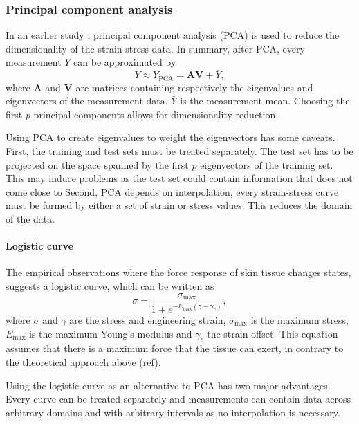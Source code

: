 \subsubsection{Principal component analysis}
In an earlier study \cite{Soylu2022}, principal component analysis (PCA) is used to reduce the dimensionality of the strain-stress data.
In summary, after PCA, every measurement $Y$ can be approximated by
\begin{equation}\label{eq:pca}
    Y \approx Y_\mathrm{PCA} = \mathbf{A} \mathbf{V} + \bar{Y},
\end{equation}
where $\mathbf{A}$ and $\mathbf{V}$ are matrices containing respectively the eigenvalues and eigenvectors of the measurement data.
$\bar{Y}$ is the measurement mean.
Choosing the first $p$ principal components allows for dimensionality reduction.

Using PCA to create eigenvalues to weight the eigenvectors has some caveats.
First, the training and test sets must be treated separately.
The test set has to be projected on the space spanned by the first $p$ eigenvectors of the training set.
This may induce problems as the test set could contain information that does not come close to
Second, PCA depends on interpolation, \ie every strain-stress curve must be formed by either a set of strain or stress values.
This reduces the domain of the data.

\paragraph{Logistic curve}
The empirical observations where the force response of skin tissue changes states, suggests a logistic curve, which can be written as
\begin{equation}\label{eq:logistic_curve}
    \sigma = \frac{\sigma_\mathrm{max}}{1+e^{-E_\mathrm{max} (\gamma - \gamma_c)}},
\end{equation}
where $\sigma$ and $\gamma$ are the stress and engineering strain, $\sigma_\mathrm{max}$ is the maximum stress, $E_\mathrm{max}$ is the maximum Young's modulus and $\gamma_c$ the strain offset.
This equation assumes that there is a maximum force that the tissue can exert, in contrary to the theoretical approach above (ref).

Using the logistic curve as an alternative to PCA has two major advantages.
Every curve can be treated separately and measurements can contain data across arbitrary domains and with arbitrary intervals as no interpolation is necessary.

